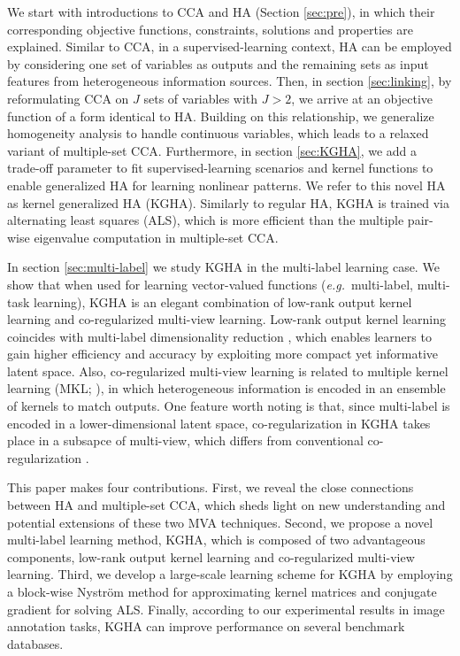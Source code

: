 \documentclass[a4paper]{article}
\begin{document}
We start with introductions to CCA and HA (Section \ref{sec:pre}), in which their corresponding objective 
functions, constraints, solutions and properties are explained. Similar to CCA, in a supervised-learning context, HA can be employed by considering one set of variables as 
outputs and the remaining sets as input 
features from heterogeneous information sources. 
Then, in section \ref{sec:linking}, by reformulating CCA on $J$ sets of variables with $J>2$, we 
arrive at an objective function of a form identical to HA.  Building on this relationship, we generalize homogeneity analysis to handle continuous 
variables, which leads to a relaxed variant of multiple-set CCA. Furthermore, in section \ref{sec:KGHA}, we add a trade-off parameter to fit supervised-learning scenarios and kernel functions to 
enable generalized HA for learning nonlinear patterns.  
We refer to this novel HA as kernel generalized HA (KGHA). Similarly to regular HA, KGHA is trained via alternating least squares (ALS), which is more efficient than the multiple pair-wise eigenvalue  
computation in multiple-set CCA. 

In section \ref{sec:multi-label} we study KGHA in the multi-label learning case.  We show that when used 
for learning vector-valued functions (\emph{e.g.}\ multi-label, multi-task learning), KGHA is an elegant combination of low-rank output kernel learning and co-regularized multi-view learning. 
Low-rank output kernel learning coincides with multi-label dimensionality reduction \cite{sun_MLDR}, which enables learners to gain higher efficiency and 
accuracy \cite{Ji_2009_IJCAI} by exploiting more compact yet informative latent space. Also, co-regularized multi-view learning  is related to multiple kernel learning 
(MKL; \citeauthor{MKL_cv} \citeyear{MKL_cv}), in which heterogeneous information is encoded in an ensemble of kernels to match outputs. One feature worth noting is that, 
since multi-label is encoded in a lower-dimensional latent space, co-regularization in KGHA takes place in a subsapce of multi-view, which differs from conventional 
co-regularization \cite{Rosenberg_2007_AISTATS}.                   

This paper makes four contributions. First, we reveal the close connections between HA and multiple-set CCA, which sheds light on new understanding   
and potential extensions of these two MVA techniques. 
Second, we propose a novel multi-label learning method, KGHA, which is composed of two advantageous components, low-rank output kernel 
learning and co-regularized multi-view learning. 
Third, we develop a large-scale learning scheme for KGHA by employing a block-wise Nystr{\"o}m method for approximating kernel matrices and conjugate gradient for solving ALS.           
Finally, according to our experimental results in image annotation tasks, KGHA can improve performance on several benchmark databases.    
          
\end{document}
